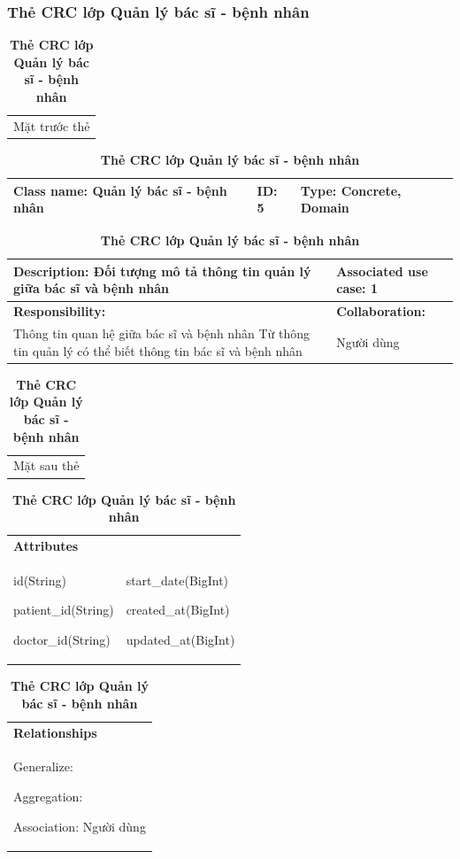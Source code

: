 \subsubsection{Thẻ CRC lớp Quản lý bác sĩ - bệnh nhân}
  \begin{table}[H]
    \caption{\bfseries \fontsize{12pt}{0pt}\selectfont Thẻ CRC lớp Quản lý bác sĩ - bệnh nhân}
    \centering
    \begin{tabularx}{0.9\textwidth}{X}
      Mặt trước thẻ
    \end{tabularx}
    \begin{tabularx}{0.9\textwidth}{|X|X|X|}
      \hline
      \textbf{Class name:} Quản lý bác sĩ - bệnh nhân & \textbf{ID:} 5 & \textbf{Type:} Concrete, Domain \\
      \hline
    \end{tabularx}
    \begin{tabularx}{0.9\textwidth}{|X|X|}
      \textbf{Description:} Đối tượng mô tả thông tin quản lý giữa bác sĩ và bệnh nhân & \textbf{Associated use case:} 1 \\
      \hline
      \textbf{Responsibility:} & \textbf{Collaboration:} \\
      Thông tin quan hệ giữa bác sĩ và bệnh nhân
      Từ thông tin quản lý có thể biết thông tin bác sĩ và bệnh nhân 
      & 
      Người dùng
      \\
      \hline
    \end{tabularx}
    \begin{tabularx}{0.9\textwidth}{X}
      Mặt sau thẻ
    \end{tabularx}
    \begin{tabularx}{0.9\textwidth}{|X|X|}
      \hline
      \textbf{Attributes} & \\
      id(String) 
      
      patient\_id(String)

      doctor\_id(String)
      & 
      start\_date(BigInt) 
            
      created\_at(BigInt)

      updated\_at(BigInt)
      \\
      \hline
    \end{tabularx}
    \begin{tabularx}{0.9\textwidth}{|X|}
      \textbf{Relationships} \\
      Generalize:  

      Aggregation:  
      
      Association: Người dùng 
      \\
      \hline
    \end{tabularx}
  \end{table}

